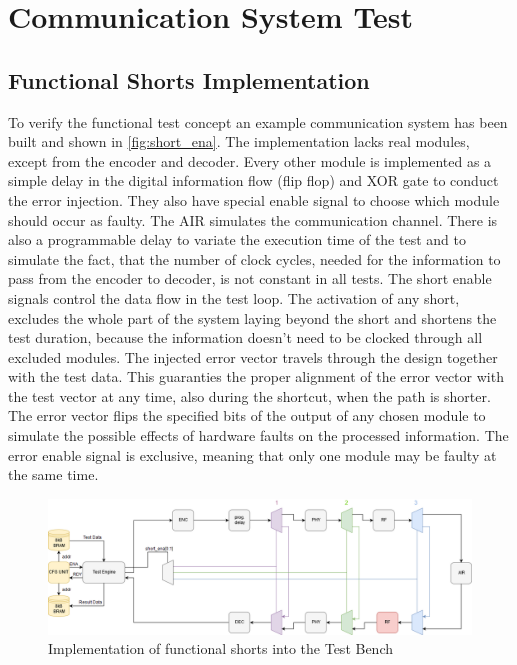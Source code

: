 \chapter{Communication System Test}\label{ch:experiment}

\section{Functional Shorts Implementation}
To verify the functional test concept an example communication system has been built and shown in \autoref{fig:short_ena}. The implementation lacks real modules, except from the encoder and decoder. Every other module is implemented as a simple delay in the digital information flow (flip flop) and XOR gate to conduct the error injection. They also have special enable signal to choose which module should occur as faulty. The AIR simulates the communication channel. There is also a programmable delay to variate the execution time of the test and to simulate the fact, that the number of clock cycles, needed for the information to pass from the encoder to decoder, is not constant in all tests. The short enable signals control the data flow in the test loop. The activation of any short, excludes the whole part of the system laying beyond the short and shortens the test duration, because the information doesn't need to be clocked through all excluded modules. The injected error vector travels through the design together with the test data. This guaranties the proper alignment of the error vector with the test vector at any time, also during the shortcut, when the path is shorter. The error vector flips the specified bits of the output of any chosen module to simulate the possible effects of hardware faults on the processed information. The error enable signal is exclusive, meaning that only one module may be faulty at the same time. 

\begin{figure}[h]
\centering
\includegraphics[width=\textwidth]{figures/Short_ena_err.png}
\caption{Implementation of functional shorts into the Test Bench}
\label{fig:short_ena}
\end{figure}

